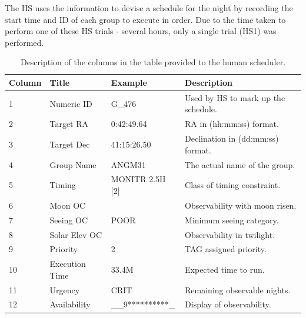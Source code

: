 The HS uses the information to devise a schedule for the night by recording the start time and ID of each group to execute in order. Due to the time taken to perform one of these HS trials - several hours, only a single trial (HS1) was performed.


\begin{table}
\begin{center}
\begin{tabular}{|l|l|l|p{6cm}|}
\hline
{\bf Column} & {\bf Title}  & {\bf Example} & {\bf Description}\\
\hline
1  & Numeric ID     & G\_476          & Used by HS to mark up the schedule.\\
2  & Target RA      & 0:42:49.64      & RA in (hh:mm:ss) format.\\
3  & Target Dec     & 41:15:26.50     & Declination in (dd:mm:ss) format.\\
4  & Group Name     & ANGM31          & The actual name of the group.\\
5  & Timing         & MONITR 2.5H [2] & Class of timing constraint.\\
6  & Moon OC        &                 & Observability with moon risen.\\
7  & Seeing OC      & POOR            & Minimum seeing category.\\
8  & Solar Elev OC  &                 & Observability in twilight.\\
9  & Priority       & 2               & TAG assigned priority.\\
10 & Execution Time & 33.4M           & Expected time to run.\\
11 & Urgency        & CRIT              & Remaining observable nights.\\
12 & Availability   & \_\_9**********\_ & Display of observability. \\

\hline

\end{tabular}
\caption{Description of the columns in the table provided to the human scheduler.}
\label{tab:hsgexample}
\end{center}
\end{table}

\clearpage

